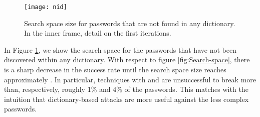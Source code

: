 \documentclass[a4paper,twocolumn]{article}
\begin{document}
\begin{figure}
\begin{centering}
\texttt{[image: nid]}
\par\end{centering}

\caption{\label{fig:Variant-of-figure}Search space size for passwords that
are not found in any dictionary. In the inner frame, detail on the
first iterations.}

\end{figure}


In Figure \ref{fig:Variant-of-figure}, we show the search space for
the passwords that have not been discovered within any dictionary.
With respect to figure \ref{fig:Search-space}, there is a sharp decrease
in the success rate until the search space size reaches approximately
. In particular, techniques with  and  are unsuccessful
to break more than, respectively, roughly 1\% and 4\% of the passwords.
This matches with the intuition that dictionary-based attacks are
more useful against the less complex passwords.
\end{document}
